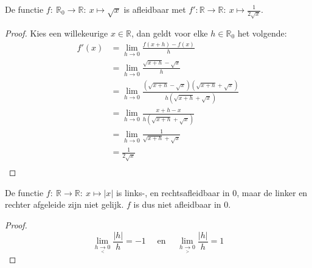 \documentclass[main.tex]{subfiles}
\begin{document}
\begin{vb}
  De functie $f:\ \mathbb{R}_{0} \rightarrow \mathbb{R}:\ x \mapsto \sqrt{x}$ is afleidbaar met $f': \mathbb{R} \rightarrow \mathbb{R}:\ x \mapsto \frac{1}{2\sqrt{x}}$.

  \begin{proof}
    Kies een willekeurige $x \in \mathbb{R}$, dan geldt voor elke $h\in \mathbb{R}_{0}$ het volgende:
    \[ 
    \begin{array}{rl}
    f'(x)
    &= \lim_{h \rightarrow 0}\frac{f(x+h)-f(x)}{h}\\
    &= \lim_{h \rightarrow 0}\frac{\sqrt{x+h}-\sqrt{x}}{h}\\
    &= \lim_{h \rightarrow 0}\frac{\left(\sqrt{x+h}-\sqrt{x}\right)\left(\sqrt{x+h}+\sqrt{x}\right)}{h\left(\sqrt{x+h}+\sqrt{x}\right)}\\
    &= \lim_{h \rightarrow 0}\frac{x+h-x}{h\left(\sqrt{x+h}+\sqrt{x}\right)}\\
    &= \lim_{h \rightarrow 0}\frac{1}{\sqrt{x+h}+\sqrt{x}}\\
    &= \frac{1}{2\sqrt{x}}\\
  \end{array}
    \]
  \end{proof}
\end{vb}

\begin{tvb}
  De functie $f:\ \mathbb{R} \rightarrow \mathbb{R}:\ x \mapsto |x|$ is links-, en rechtsafleidbaar in $0$, maar de linker en rechter afgeleide zijn niet gelijk. $f$ is dus niet afleidbaar in $0$.
  
  \begin{proof}
    \[ \lim_{h \underset{<}{\rightarrow} 0}\frac{|h|}{h} = -1 \quad\text{ en }\quad \lim_{h \underset{>}{\rightarrow} 0}\frac{|h|}{h} = 1 \]
  \end{proof}
\end{tvb}
\end{document}
